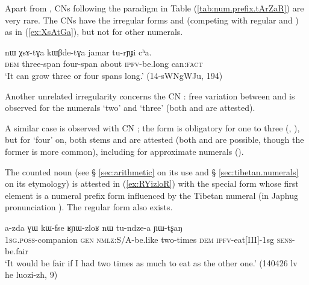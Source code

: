 Apart from  , CNs following the paradigm in Table (\ref{tab:num.prefix.tArZaR}) are very rare. The CNs   have the irregular forms  and  (competing with regular  and ) as in (\ref{ex:XsAtGa}), but not for other numerals. 

\begin{exe}
\ex \label{ex:XsAtGa}
\gll nɯ χsɤ-tɣa kɯβde-tɣa jamar tu-rɲɟi cʰa. \\
\textsc{dem} three-span four-span about \textsc{ipfv}-be.long can:\textsc{fact} \\
\glt `It can grow three or four spans long.' (14-sWNgWJu, 194)
\end{exe}

Another unrelated irregularity concerns the CN : free variation between  and  is observed for the numerals `two' and `three' (both  and  are attested).

A similar case is observed with CN ; the form  is obligatory for one to three (, ), but for `four' on, both stems  and  are attested (both  and  are possible, though the former is more common), including for approximate numerals ().  

The counted noun  (see § \ref{sec:arithmetic} on its use and § \ref{sec:tibetan.numerals} on its etymology) is attested in (\ref{ex:RYizloR}) with the special form  whose first element is a numeral prefix form  influenced by the Tibetan numeral  (in Japhug pronunciation ). The regular form  also exists.
 
\begin{exe}
\ex \label{ex:RYizloR}
 \gll a-zda ɣɯ kɯ-fse ʁɲɯ-zloʁ nɯ tu-ndze-a ɲɯ-tʂaŋ \\
 \textsc{1sg}.\textsc{poss}-companion \textsc{gen} \textsc{nmlz}:S/A-be.like two-times \textsc{dem} \textsc{ipfv}-eat[III]-1sg \textsc{sens}-be.fair \\
\glt `It would be fair if I had two times as much to eat as the other one.' (140426 lv he luozi-zh, 9)
\end{exe}

